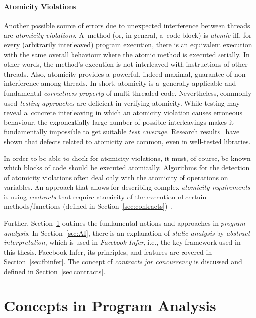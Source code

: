 \paragraph{Atomicity Violations~\cite{atomizer}}
Another possible source of errors due to unexpected interference between threads are \emph{atomicity violations}. A~method (or, in general, a~code block) is \emph{atomic} iff, for every (arbitrarily interleaved) program execution, there is an equivalent execution with the same overall behaviour where the atomic method is executed serially. In other words, the method's execution is not interleaved with instructions of other threads. Also, atomicity provides a~powerful, indeed maximal, guarantee of non-interference among threads. In short, atomicity is a~generally applicable and fundamental \emph{correctness property} of multi-threaded code. Nevertheless, commonly used \emph{testing approaches} are deficient in verifying atomicity. While testing may reveal a~concrete interleaving in which an atomicity violation causes erroneous behaviour, the exponentially large number of possible interleavings makes it fundamentally impossible to get suitable \emph{test coverage}. Research results~\cite{contracts2017, atomizer, contracts2015, atomicityOOP} have shown that defects related to atomicity are common, even in well-tested libraries.

In order to be able to check for atomicity violations, it must, of course, be known which blocks of code should be executed atomically. Algorithms for the detection of atomicity violations often deal only with the atomicity of operations on variables. An approach that allows for describing complex \emph{atomicity requirements} is using \emph{contracts} that require atomicity of the execution of certain methods/functions (defined in Section~\ref{sec:contracts})~\cite{muzikovskaBP}.

Further, Section~\ref{sec:programAnalysis} outlines the fundamental notions and approaches in \emph{program analysis}. In Section~\ref{sec:AI}, there is an explanation of \emph{static analysis} by \emph{abstract interpretation}, which is used in \emph{Facebook Infer}, i.e., the key framework used in this thesis. Facebook Infer, its principles, and features are covered in Section~\ref{sec:fbinfer}. The concept of \emph{contracts for concurrency} is discussed and defined in Section~\ref{sec:contracts}.


\section{Concepts in Program Analysis}
\label{sec:programAnalysis}

